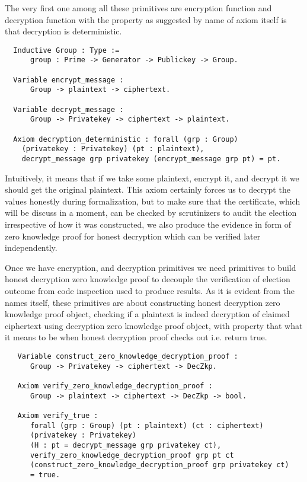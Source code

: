 \documentclass{llncs}
\begin{document}
 The very first one among all these primitives 
are encryption function and decryption function with the property as suggested 
by name of axiom itself is that decryption is deterministic. 

\begin{verbatim}
  Inductive Group : Type :=
      group : Prime -> Generator -> Publickey -> Group. 

  Variable encrypt_message :
      Group -> plaintext -> ciphertext.
      
  Variable decrypt_message :
      Group -> Privatekey -> ciphertext -> plaintext.
 
  Axiom decryption_deterministic : forall (grp : Group) 
    (privatekey : Privatekey) (pt : plaintext), 
    decrypt_message grp privatekey (encrypt_message grp pt) = pt.
 \end{verbatim}
 
 Intuitively, it means that if we take some plaintext, encrypt it, and decrypt it 
 we should get the original plaintext. This axiom certainly forces us to decrypt
  the values 
 honestly during formalization, but to make sure that the certificate, which 
 will be discuss in a moment, can be checked 
 by scrutinizers to audit the election irrespective of how it was constructed, 
 we also produce the evidence in form of zero knowledge proof for honest decryption which
 can be verified later independently. 
 
 Once we have encryption, and decryption primitives we need primitives to build 
 honest decryption zero knowledge proof to decouple the verification of election 
 outcome from code inspection used to produce results.
 As it is evident from the names itself, these primitives are about constructing honest
 decryption zero knowledge proof object, checking if a plaintext is indeed 
 decryption of claimed ciphertext using decryption zero knowledge proof object, 
 with property that what it means to be when honest decryption proof 
 checks out i.e. return true.
 
 \begin{verbatim}
   Variable construct_zero_knowledge_decryption_proof :
      Group -> Privatekey -> ciphertext -> DecZkp.

   Axiom verify_zero_knowledge_decryption_proof :
      Group -> plaintext -> ciphertext -> DecZkp -> bool. 
   
   Axiom verify_true :
      forall (grp : Group) (pt : plaintext) (ct : ciphertext) 
      (privatekey : Privatekey)
      (H : pt = decrypt_message grp privatekey ct),
      verify_zero_knowledge_decryption_proof grp pt ct
      (construct_zero_knowledge_decryption_proof grp privatekey ct) 
      = true.
 \end{verbatim}
 
\end{document}
